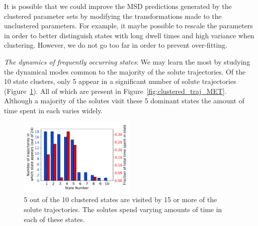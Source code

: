 \documentclass[journal=jpcbfk,manuscript=article]{achemso}
\begin{document}
  It is possible that we could improve the MSD predictions generated by the 
  clustered parameter sets by modifying the transformations made to the
  unclustered parameters. For example, it maybe possible to rescale the
  parameters in order to better distinguish states with long dwell times
  and high variance when clustering.
  However, we do not go too far in order to prevent over-fitting.
  
  \textit{The dynamics of frequently occurring states}: We may learn the most by 
  studying the dynamical modes common to the majority of the solute trajectories.
  Of the 10 state clusters, only 5 appear in a significant number of solute 
  trajectories (Figure~\ref{fig:prevalence}). All of which are present in 
  Figure~\ref{fig:clustered_traj_MET}. Although a majority of the solutes
  visit these 5 dominant states the amount of time spent in each varies widely. 
  
  \begin{figure}
  \centering
  \includegraphics[width=0.5\textwidth]{prevalence.pdf}
  \caption{5 out of the 10 clustered states are visited by 15 or more of the solute
  trajectories. The solutes spend varying amounts of time in each of these states.
  }
  \label{fig:prevalence}
  \end{figure}
  
\end{document}
